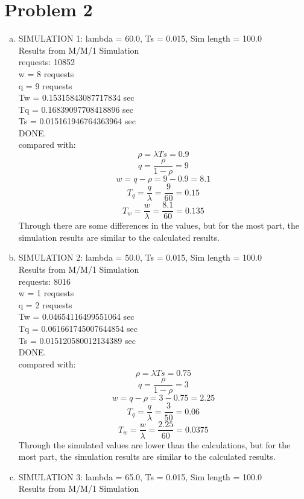 \documentclass{article}   	                         %
\begin{document}
\section*{Problem 2}
\begin{enumerate}[(a)]
\item
SIMULATION 1: lambda = 60.0, Ts = 0.015, Sim length = 100.0\\
Results from M/M/1 Simulation\\
requests: 10852\\
w = 8  requests\\
q = 9  requests\\
Tw = 0.15315843087717834 sec\\
Tq = 0.16839097708418896  sec\\
Ts = 0.015161946764363964  sec\\
DONE.\\
compared with:\\
$$\rho = \lambda Ts = 0.9$$
$$q = \frac{\rho}{1-\rho} = 9$$
$$w = q-\rho = 9-0.9 = 8.1$$
$$T_q = \frac{q}{\lambda} = \frac{9}{60} = 0.15$$
$$T_w = \frac{w}{\lambda} = \frac{8.1}{60} = 0.135$$
Through there are some differences in the values, but for the most part, the simulation results are similar to the calculated results.\\
\item
SIMULATION 2: lambda = 50.0, Ts = 0.015, Sim length = 100.0\\
Results from M/M/1 Simulation\\
requests: 8016\\
w = 1  requests\\
q = 2  requests\\
Tw = 0.04654116499551064 sec\\
Tq = 0.061661745007644854  sec\\
Ts = 0.015120580012134389  sec\\
DONE.\\
compared with:\\
$$\rho = \lambda Ts = 0.75$$
$$q = \frac{\rho}{1-\rho} = 3$$
$$w = q-\rho = 3-0.75 = 2.25$$
$$T_q = \frac{q}{\lambda} = \frac{3}{50} = 0.06$$
$$T_w = \frac{w}{\lambda} = \frac{2.25}{60} = 0.0375$$
Through the simulated values are lower than the calculations, but for the most part, the simulation results are similar to the calculated results.\\
\item
SIMULATION 3: lambda = 65.0, Ts = 0.015, Sim length = 100.0\\
Results from M/M/1 Simulation\\

\end{enumerate}
\end{document}
